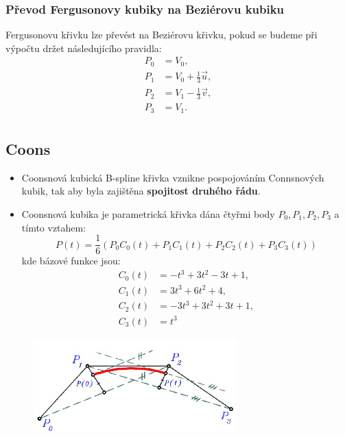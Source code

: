 \subsubsection{Převod Fergusonovy kubiky na Beziérovu kubiku}
Fergusonovu křivku lze převést na Beziérovu křivku, pokud se budeme při výpočtu držet následujícího pravidla:
\begin{equation*}\label{prevodfergusbezier}
\begin{split}
P_0 &= V_0,\\
P_1 &= V_0 + \frac{1}{3}\vec{u},\\
P_2 &= V_1 - \frac{1}{3}\vec{v},\\
P_3 &= V_1.\\
\end{split}
\end{equation*}

\subsection{Coons}
\begin{itemize}
	\item Coonsnová kubická B-spline křivka vznikne pospojováním Connsnových kubik, tak aby byla zajištěna \textbf{spojitost druhého řádu}.
	\item Coonsnová kubika je parametrická křivka dána čtyřmi body $P_0, P_1, P_2, P_3$ a tímto vztahem:
		\begin{equation*} 
			P(t) = \frac{1}{6} (P_0C_0(t) + P_1C_1(t) + P_2C_2(t) + P_3C_3(t))
		\end{equation*}
		kde bázové funkce jsou:
		\begin{equation*} 
		\begin{split}
			C_0(t) &= -t^3 + 3t^2 - 3t + 1, \\
			C_1(t) &= 3t^3 + 6t^2 + 4, \\
			C_2(t) &= -3t^3 + 3t^2 + 3t + 1, \\
			C_3(t) &= t^3
		\end{split}		
		\end{equation*}
\end{itemize}
\begin{figure}[H]
\centering
\includegraphics[width=0.7\textwidth]{assets/2_coons-b-spline}
\end{figure}
